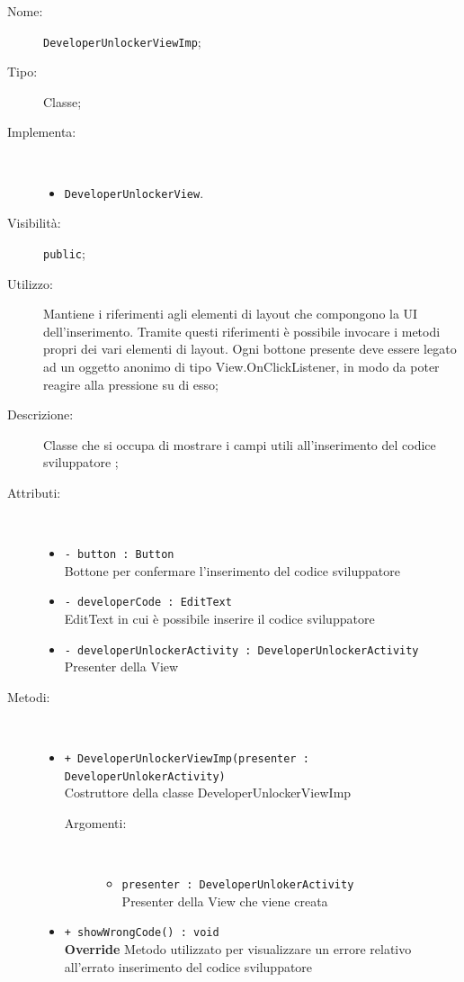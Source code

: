 \documentclass[../DefinizioneDiProdotto.tex]{subfiles}
\begin{document}
\begin{description}
	\item[Nome:] \texttt{DeveloperUnlockerViewImp};
	\item[Tipo:] Classe;
	\item[Implementa:] \
	\begin{itemize}
		\item \texttt{DeveloperUnlockerView}.
		
	\end{itemize}
	\item[Visibilità:] \texttt{public};
	\item[Utilizzo:] Mantiene i riferimenti agli elementi di layout che compongono la UI dell'inserimento. Tramite questi riferimenti è possibile invocare i metodi propri dei vari elementi di layout. Ogni bottone presente deve essere legato ad un oggetto anonimo di tipo View.OnClickListener, in modo da poter reagire alla pressione su di esso;
	\item[Descrizione:] Classe che si occupa di mostrare i campi utili all'inserimento del codice sviluppatore
	;
	\item[Attributi:] \
	\begin{itemize}
		\item \texttt{- button : Button}\\
		Bottone per confermare l'inserimento del codice sviluppatore
		
		\item \texttt{- developerCode : EditText}\\
		EditText in cui è possibile inserire il codice sviluppatore
		
		\item \texttt{- developerUnlockerActivity : DeveloperUnlockerActivity}\\
		Presenter della View
		
	\end{itemize}
	\item[Metodi:] \
	\begin{itemize}
		\item \texttt{+ DeveloperUnlockerViewImp(presenter : DeveloperUnlokerActivity)}\\
		Costruttore della classe DeveloperUnlockerViewImp
		\begin{description}
			\item[Argomenti:] \
			\begin{itemize}
				\item \texttt{presenter : DeveloperUnlokerActivity}\\
				Presenter della View che viene creata\end{itemize}
		\end{description}
		\item \texttt{+ showWrongCode() : void}\\
		\textbf{Override} Metodo utilizzato per visualizzare un errore relativo all'errato inserimento del codice sviluppatore
	\end{itemize}
\end{description}
\end{document}

